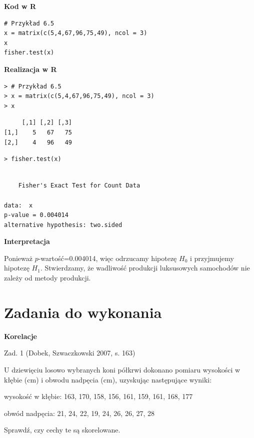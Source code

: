\documentclass[12pt,B5paper,]{book}
\begin{document}
\vspace{0.8cm} \textbf{Kod w R}

\begin{verbatim}
# Przykład 6.5
x = matrix(c(5,4,67,96,75,49), ncol = 3)
x
fisher.test(x)
\end{verbatim}

\vspace{0.8cm} \textbf{Realizacja w R}

\begin{verbatim}
> # Przykład 6.5
> x = matrix(c(5,4,67,96,75,49), ncol = 3)
> x
\end{verbatim}

\begin{verbatim}
     [,1] [,2] [,3]
[1,]    5   67   75
[2,]    4   96   49
\end{verbatim}

\begin{verbatim}
> fisher.test(x)
\end{verbatim}

\begin{verbatim}

    Fisher's Exact Test for Count Data

data:  x
p-value = 0.004014
alternative hypothesis: two.sided
\end{verbatim}

\vspace{0.8cm} \textbf{Interpretacja}

Ponieważ \(p\)-wartość=0.004014, więc odrzucamy hipotezę \(H_0\) i
przyjmujemy hipotezę \(H_1\). Stwierdzamy, że wadliwość produkcji
luksusowych samochodów nie zależy od metody produkcji.

\section{Zadania do wykonania}\label{zadania-do-wykonania-5}

\textbf{Korelacje}

Zad. 1 (Dobek, Szwaczkowski 2007, s. 163)

U dziewięciu losowo wybranych koni półkrwi dokonano pomiaru wysokości w
kłębie (cm) i obwodu nadpęcia (cm), uzyskując następujące wyniki:

wysokość w kłębie: 163, 170, 158, 156, 161, 159, 161, 168, 177

obwód nadpęcia: 21, 24, 22, 19, 24, 26, 26, 27, 28

Sprawdź, czy cechy te są skorelowane.
\end{document}
